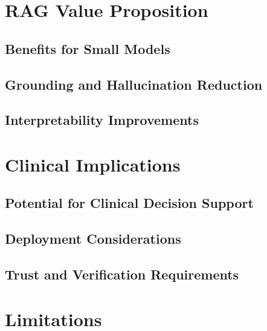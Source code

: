 %
%
\section{RAG Value Proposition}
\label{sec:discussion:rag}

\subsection{Benefits for Small Models}
\label{subsec:discussion:rag:small}

\subsection{Grounding and Hallucination Reduction}
\label{subsec:discussion:rag:grounding}

\subsection{Interpretability Improvements}
\label{subsec:discussion:rag:interpretability}

%
%
\section{Clinical Implications}
\label{sec:discussion:clinical}

\subsection{Potential for Clinical Decision Support}
\label{subsec:discussion:clinical:cds}

\subsection{Deployment Considerations}
\label{subsec:discussion:clinical:deployment}

\subsection{Trust and Verification Requirements}
\label{subsec:discussion:clinical:trust}

%
%
\section{Limitations}
\label{sec:discussion:limitations}

